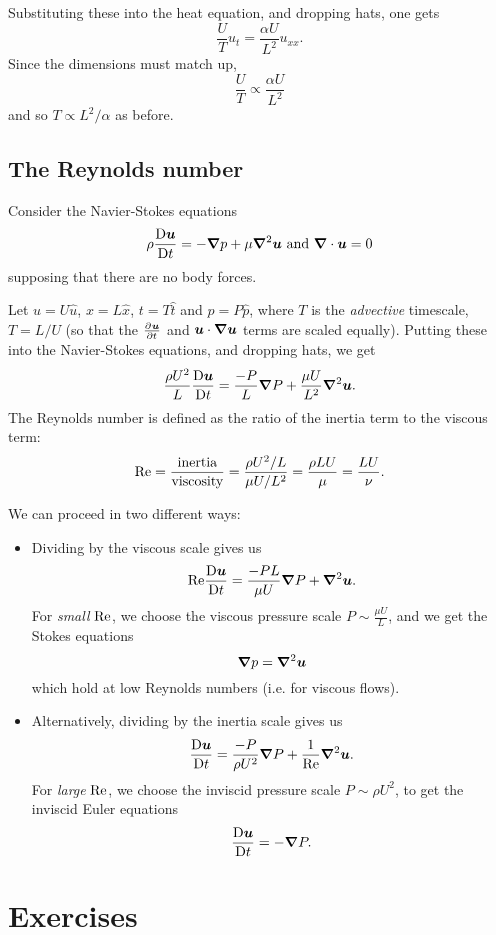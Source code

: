 \documentclass{article}
\begin{document}
Substituting these into the heat equation, and dropping hats, one gets
$$ \frac{U}{T} u_t = \frac{\alpha U}{L^2} u_{xx}. $$
Since the dimensions must match up, 
$$ \frac{U}{T} \propto \frac{\alpha U}{L^2} $$
and so $T \propto L^2/\alpha$ as before.

\subsection{The Reynolds number}

Consider the Navier-Stokes equations
$$ \rho\frac{\mathrm{D}\boldsymbol{u}}{\mathrm{D}t} = -\boldsymbol{\nabla} p + \mu \boldsymbol{\nabla}^2 \boldsymbol{u} \text{ and } \boldsymbol{\nabla}\cdot\boldsymbol{u}=0 $$
supposing that there are no body forces.

Let $u = U\hat{u}$, $x = L\hat{x}$, $t = T\hat{t}$ and $p = P\hat{p}$, where $T$
is the \textit{advective} timescale, $T = L/U$ (so that the $\pd{\bs{u}}{t}$ and
$\boldsymbol{u}\cdot\boldsymbol{\nabla}\boldsymbol{u}$ terms are scaled equally). Putting these into the
Navier-Stokes equations, and dropping hats, we get
$$ \frac{\rho U^2}{L} \frac{\mathrm{D}\boldsymbol{u}}{\mathrm{D}t} = \frac{-P}{L} \boldsymbol{\nabla} P + \frac{\mu U}{L^2} \boldsymbol{\nabla}^2 \boldsymbol{u}. $$
The Reynolds number is defined as the ratio of the inertia term to the viscous term:
\begin{equation}
 \mathrm{Re} = \frac{\text{inertia}}{\text{viscosity}}  
      = \frac{\rho U^2 / L}{\mu U / L^2} 
      = \frac{\rho L U}{\mu} 
      = \frac{LU}{\nu}.
\end{equation}

We can proceed in two different ways:
\begin{itemize}
\item Dividing by the viscous scale gives us
$$ \mathrm{Re}\frac{\mathrm{D}\boldsymbol{u}}{\mathrm{D}t} = \frac{-PL}{\mu U} \boldsymbol{\nabla} P + \boldsymbol{\nabla}^2\boldsymbol{u}. $$
For \textit{small} $\mathrm{Re}$, we choose the viscous pressure scale $P\sim\frac{\mu U}{L}$, 
and we get the Stokes equations 
$$ \boldsymbol{\nabla} p = \boldsymbol{\nabla}^2 \boldsymbol{u} $$
which hold at low Reynolds numbers (i.e. for viscous flows).

\item Alternatively, dividing by the inertia scale gives us
$$ \frac{\mathrm{D}\boldsymbol{u}}{\mathrm{D}t} = \frac{-P}{\rho U^2} \boldsymbol{\nabla} P + \frac{1}{\mathrm{Re}} \boldsymbol{\nabla}^2\boldsymbol{u}. $$
For \textit{large} $\mathrm{Re}$, we choose the inviscid pressure scale $P\sim\rho U^2$,
to get the inviscid Euler equations 
$$ \frac{\mathrm{D}\boldsymbol{u}}{\mathrm{D}t} = -\boldsymbol{\nabla} P. $$
\end{itemize}

\section{Exercises}
\end{document}
